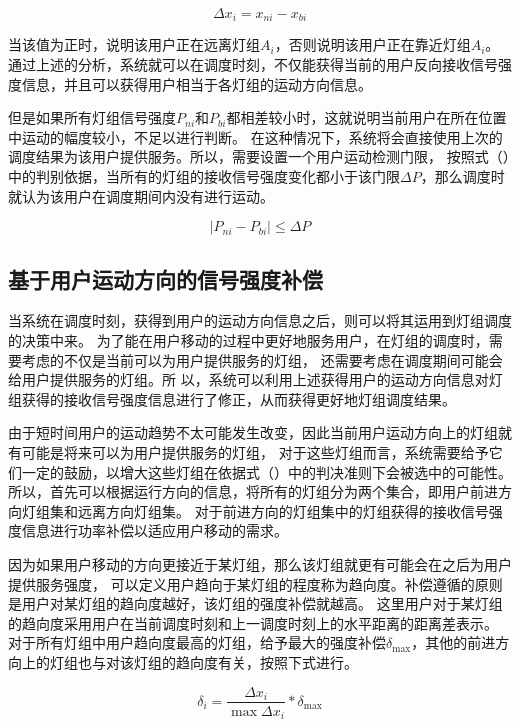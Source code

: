 \begin{equation}
    \Delta {x_i} = {x_{ni}} - {x_{bi}}
\end{equation}

当该值为正时，说明该用户正在远离灯组$A_{i}$，否则说明该用户正在靠近灯组$A_{i}$。
通过上述的分析，系统就可以在调度时刻，不仅能获得当前的用户反向接收信号强度信息，并且可以获得用户相当于各灯组的运动方向信息。

但是如果所有灯组信号强度$P_{ni}$和$P_{bi}$都相差较小时，这就说明当前用户在所在位置中运动的幅度较小，不足以进行判断。
在这种情况下，系统将会直接使用上次的调度结果为该用户提供服务。所以，需要设置一个用户运动检测门限，
按照式（）中的判别依据，当所有的灯组的接收信号强度变化都小于该门限$\Delta P$，那么调度时就认为该用户在调度期间内没有进行运动。

\begin{equation}
    \left| {{P_{ni}} - {P_{bi}}} \right| \le \Delta P
\end{equation}

\subsection{基于用户运动方向的信号强度补偿}
当系统在调度时刻，获得到用户的运动方向信息之后，则可以将其运用到灯组调度的决策中来。
为了能在用户移动的过程中更好地服务用户，在灯组的调度时，需要考虑的不仅是当前可以为用户提供服务的灯组，
还需要考虑在调度期间可能会给用户提供服务的灯组。所
以，系统可以利用上述获得用户的运动方向信息对灯组获得的接收信号强度信息进行了修正，从而获得更好地灯组调度结果。

由于短时间用户的运动趋势不太可能发生改变，因此当前用户运动方向上的灯组就有可能是将来可以为用户提供服务的灯组，
对于这些灯组而言，系统需要给予它们一定的鼓励，以增大这些灯组在依据式（）中的判决准则下会被选中的可能性。
所以，首先可以根据运行方向的信息，将所有的灯组分为两个集合，即用户前进方向灯组集和远离方向灯组集。
对于前进方向的灯组集中的灯组获得的接收信号强度信息进行功率补偿以适应用户移动的需求。

因为如果用户移动的方向更接近于某灯组，那么该灯组就更有可能会在之后为用户提供服务强度，
可以定义用户趋向于某灯组的程度称为趋向度。补偿遵循的原则是用户对某灯组的趋向度越好，该灯组的强度补偿就越高。
这里用户对于某灯组的趋向度采用用户在当前调度时刻和上一调度时刻上的水平距离的距离差表示。
对于所有灯组中用户趋向度最高的灯组，给予最大的强度补偿$\delta_{\max}$，其他的前进方向上的灯组也与对该灯组的趋向度有关，按照下式进行。

\begin{equation}
    {\delta _i} = \frac{{\Delta {x_i}}}{{\max \Delta {x_i}}}*{\delta _{\max }}
\end{equation}

